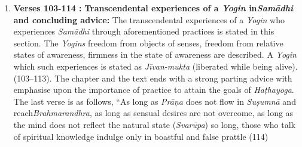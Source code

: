 \begin{enumerate}
\item \textbf{Verses 103-114 :} \textbf{Transcendental experiences of a \textit{Yogin} in\break \textit{Samādhi} and concluding advice:} The transcendental experiences of a \textit{Yogin} who experiences \textit{Samādhi} through aforementioned practices is stated in this section. The \textit{Yogins} freedom from objects of senses, freedom from relative states of awareness, firmness in the state of awareness are described. A \textit{Yogin} which such experiences is stated as \textit{Jīvan-mukta} (liberated while being alive). (103--113). The chapter and the text ends with a strong parting advice with emphasise upon the importance of practice to attain the goals of \textit{Haṭhayoga}. The last verse is as follows, “As long as \textit{Prāṇa} does not flow in \textit{Suṣumnā} and reach\break \textit{Brahmarandhra}, as long as sensual desires are not overcome, as long as the mind does not reflect the natural state (\textit{Svarūpa}) so long, those who talk of spiritual knowledge indulge only in boastful and false prattle (114)   
\end{enumerate}
